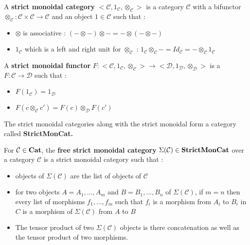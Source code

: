 \documentclass{report}
\begin{document}
\begin{defn}
    A \textbf{strict monoidal category}\cite{lane_1971} $\big<\mathcal{C},1_\mathcal{C},\otimes_\mathcal{C}\big>$ is a category $\mathcal{C}$ with a bifunctor $\otimes_\mathcal{C} : \mathcal{C}\times\mathcal{C} \rightarrow \mathcal{C}$ and an object $1\in\mathcal{C}$ such that :
    \begin{itemize}
        \item $\otimes$ is associative : $(-\otimes-)\otimes - = - \otimes (-\otimes-)$
        \item $1_\mathcal{C}$ which is a left and right unit for $\otimes_\mathcal{C}$ : $1_\mathcal{C}\otimes_\mathcal{C} - = Id_{\mathcal{C}} = - \otimes_\mathcal{C} 1_\mathcal{C}$
    \end{itemize}
    \label{strict-mon}
\end{defn}

\begin{defn}
    A \textbf{strict monoidal functor}
    $F : \big<\mathcal{C},1_\mathcal{C},\otimes_\mathcal{C}\big> \rightarrow \big<\mathcal{D},1_\mathcal{D},\otimes_\mathcal{D}\big>$
    is a $F : \mathcal{C} \rightarrow \mathcal{D}$ such that :
    \begin{itemize}
        \item $F(1_\mathcal{C}) = 1_\mathcal{D}$
        \item $F(c\otimes_\mathcal{C} c') = F(c)\otimes_\mathcal{D}F(c') $
    \end{itemize}
    \label{strict-mon_func}
\end{defn}

\begin{defn}[StrictMonCat]
    The strict monoidal categories along with the strict monoidal form a category called \bf StrictMonCat\cite{katsumata_2014}.
    \label{SrictMonCat}
\end{defn}

\begin{defn}
    For $\mathcal{C} \in \bf Cat$, the \textbf{free strict monoidal category} $ \Sigma (\mathcal{C})\in \bf StrictMonCat$ over a category $\mathcal{C}$ is a strict monoidal category such that :
    \begin{itemize}
        \item objects of $\Sigma (\mathcal{C})$ are the list of objects of $\mathcal{C}$
        \item for two objects $A = A_1,\dots,A_m$ and $B = B_1,\dots,B_n$ of $\Sigma (\mathcal{C})$, if $m = n$ then every list of morphisms $f_1,\dots,f_m$ such that $f_i$ is a morphism from $A_i$ to $B_i$ in $C$ is a morphism of $\Sigma(\mathcal{C})$ from $A$ to $B$
        \item The tensor product of two $\Sigma(\mathcal{C})$ objects is there concatenation as well as the tensor product of two morphisms.
    \end{itemize}
\end{defn}
\end{document}
